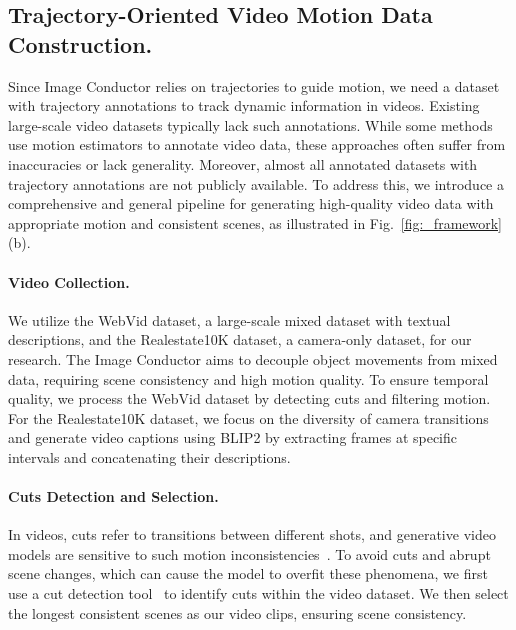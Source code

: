 \documentclass{article} %
\begin{document}
\subsection{Trajectory-Oriented Video Motion Data Construction.}
\label{Sec:3.2}
Since Image Conductor relies on trajectories to guide motion, we need a dataset with trajectory annotations to track dynamic information in videos. Existing large-scale video datasets typically lack such annotations. While some methods use motion estimators to annotate video data, these approaches often suffer from inaccuracies\citep{yin2023dragnuwa, wang2023motionctrl, wu2024draganything} or lack generality\citep{wu2024draganything}. 
Moreover, almost all annotated datasets with trajectory annotations are not publicly available. To address this, we introduce a comprehensive and general pipeline for generating high-quality video data with appropriate motion and consistent scenes, as illustrated in Fig.~\ref{fig:_framework} (b).

\paragraph{Video Collection.}
We utilize the WebVid dataset\citep{bain2021frozen}, a large-scale mixed dataset with textual descriptions, and the Realestate10K dataset\citep{zhou2018stereo}, a camera-only dataset, for our research. The Image Conductor aims to decouple object movements from mixed data, requiring scene consistency and high motion quality. 
To ensure temporal quality, we process the WebVid dataset by detecting cuts and filtering motion. For the Realestate10K dataset, we focus on the diversity of camera transitions and generate video captions using BLIP2\citep{blip2} by extracting frames at specific intervals and concatenating their descriptions.

\paragraph{Cuts Detection and Selection.}
In videos, cuts refer to transitions between different shots, and generative video models are sensitive to such motion inconsistencies~\citep{blattmann2023stable}. To avoid cuts and abrupt scene changes, which can cause the model to overfit these phenomena, we first use a cut detection tool~\protect\footnotemark{} to identify cuts within the video dataset. We then select the longest consistent scenes as our video clips, ensuring scene consistency.

\end{document}
